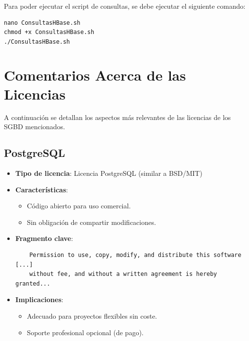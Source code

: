 \documentclass{article}
\begin{document}
Para poder ejecutar el script de consultas, se debe ejecutar el siguiente comando: 

\begin{lstlisting}[style=bashStyle]
nano ConsultasHBase.sh
chmod +x ConsultasHBase.sh
./ConsultasHBase.sh
\end{lstlisting}



\newpage
\section{Comentarios Acerca de las Licencias}

A continuación se detallan los aspectos más relevantes de las licencias de los SGBD mencionados.

\subsection{PostgreSQL}
\begin{itemize}
    \item \textbf{Tipo de licencia}: Licencia PostgreSQL (similar a BSD/MIT)
    \item \textbf{Características}:
    \begin{itemize}
        \item Código abierto para uso comercial.
        \item Sin obligación de compartir modificaciones.
    \end{itemize}
    \item \textbf{Fragmento clave}:
    \begin{verbatim}
    Permission to use, copy, modify, and distribute this software [...] 
    without fee, and without a written agreement is hereby granted...
    \end{verbatim}
    \item \textbf{Implicaciones}:
    \begin{itemize}
        \item Adecuado para proyectos flexibles sin coste.
        \item Soporte profesional opcional (de pago).
    \end{itemize}
\end{itemize}
\end{document}
